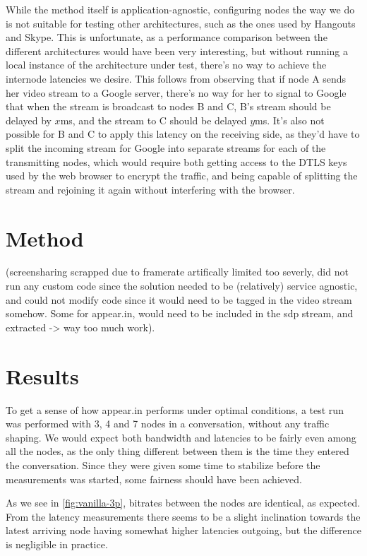 While the method itself is application-agnostic, configuring nodes the way we do is not suitable for testing other architectures, such as the ones used by Hangouts and Skype. This is unfortunate, as a performance comparison between the different architectures would have been very interesting, but without running a local instance of the architecture under test, there's no way to achieve the internode latencies we desire. This follows from observing that if node A sends her video stream to a Google server, there's no way for her to signal to Google that when the stream is broadcast to nodes B and C, B's stream should be delayed by $x$ms, and the stream to C should be delayed $y$ms. It's also not possible for B and C to apply this latency on the receiving side, as they'd have to split the incoming stream for Google into separate streams for each of the transmitting nodes, which would require both getting access to the DTLS keys used by the web browser to encrypt the traffic, and being capable of splitting the stream and rejoining it again without interfering with the browser.


\section{Method}\label{sec:method}

(screensharing scrapped due to framerate artifically limited too severly, did not run any custom code since the solution needed to be (relatively) service agnostic, and could not modify code since it would need to be tagged in the video stream somehow. Some for appear.in, would need to be included in the sdp stream, and extracted -> way too much work).


\section{Results}

To get a sense of how appear.in performs under optimal conditions, a test run was performed with 3, 4 and 7 nodes in a conversation, without any traffic shaping. We would expect both bandwidth and latencies to be fairly even among all the nodes, as the only thing different between them is the time they entered the conversation. Since they were given some time to stabilize before the measurements was started, some fairness should have been achieved.

As we see in \autoref{fig:vanilla-3p}, bitrates between the nodes are identical, as expected. From the latency measurements there seems to be a slight inclination towards the latest arriving node having somewhat higher latencies outgoing, but the difference is negligible in practice.

